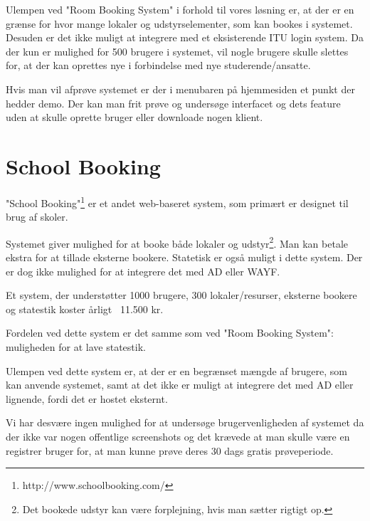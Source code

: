 Ulempen ved "Room Booking System" i forhold til vores løsning er, at der er en grænse for hvor mange lokaler og udstyrselementer, som kan bookes i systemet. Desuden er det ikke muligt at integrere med et eksisterende ITU login system. Da der kun er mulighed for 500 brugere i systemet, vil nogle brugere skulle slettes for, at der kan oprettes nye i forbindelse med nye studerende/ansatte.

Hvis man vil afprøve systemet er der i menubaren på hjemmesiden et punkt der hedder demo. Der kan man frit prøve og undersøge interfacet og dets feature uden at skulle oprette bruger eller downloade nogen klient.

\section{School Booking}
\label{Comparison_SB}
"School Booking"\footnote{http://www.schoolbooking.com/} er et andet web-baseret system, som primært er designet til brug af skoler. 

Systemet giver mulighed for at booke både lokaler og udstyr\footnote{Det bookede udstyr kan være forplejning, hvis man sætter rigtigt op.}. Man kan betale ekstra for at tillade eksterne bookere. Statetisk er også muligt i dette system. Der er dog ikke mulighed for at integrere det med AD eller WAYF.

Et system, der understøtter 1000 brugere, 300 lokaler/resurser, eksterne bookere og statestik koster årligt ~11.500 kr.

Fordelen ved dette system er det samme som ved "Room Booking System": muligheden for at lave statestik.

Ulempen ved dette system er, at der er en begrænset mængde af brugere, som kan anvende systemet, samt at det ikke er muligt at integrere det med AD eller lignende, fordi det er hostet eksternt.

Vi har desvære ingen mulighed for at undersøge brugervenligheden af systemet da der ikke var nogen offentlige screenshots og det krævede at man skulle være en registrer bruger for, at man kunne prøve deres 30 dags gratis prøveperiode.